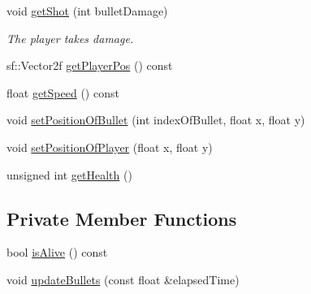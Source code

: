 \begin{DoxyCompactItemize}
void \hyperlink{class_player_a13e6164daf86c00800992d756339fe51}{get\+Shot} (int bullet\+Damage)
\begin{DoxyCompactList}\small\item\em The player takes damage. \end{DoxyCompactList}\item 
sf\+::\+Vector2f \hyperlink{class_player_aab8a89629ae8acaf8c1dc4b2e9f052c6}{get\+Player\+Pos} () const
\item 
float \hyperlink{class_player_a515920b9f3992375f179ca17ee750dc1}{get\+Speed} () const
\item 
void \hyperlink{class_player_a3bf9c265d1be1284501b8c03ca5bdfb0}{set\+Position\+Of\+Bullet} (int index\+Of\+Bullet, float x, float y)
\item 
void \hyperlink{class_player_abeaa59ae6cd6ca74f269f4af28ef8f82}{set\+Position\+Of\+Player} (float x, float y)
\item 
unsigned int \hyperlink{class_player_a1f61cee0029ef492d13e289f34e7764b}{get\+Health} ()
\end{DoxyCompactItemize}
\subsection*{Private Member Functions}
\begin{DoxyCompactItemize}
\item 
bool \hyperlink{class_player_a3966588630ad0a127c9250f985865392}{is\+Alive} () const
\item 
void \hyperlink{class_player_a66534b1473c5f9288ae8cd7001738ff9}{update\+Bullets} (const float \&elapsed\+Time)
\end{DoxyCompactItemize}
